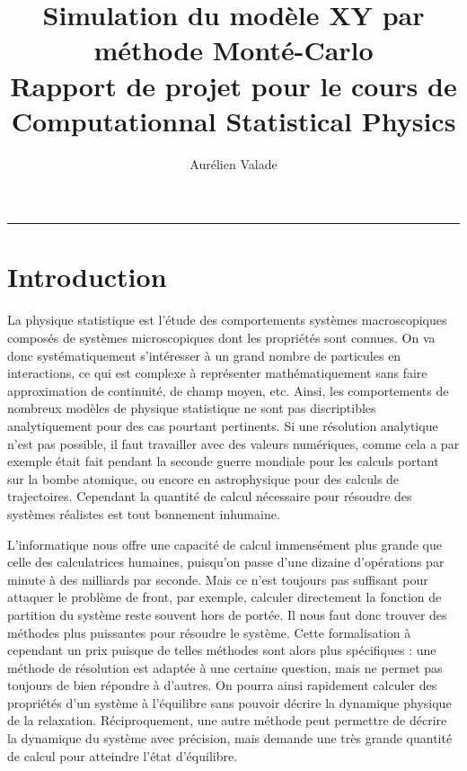 \documentclass[a4paper, openany, 11pt]{article}
\title{Simulation du modèle XY par méthode Monté-Carlo \medskip \\ 
       \Large Rapport de projet pour le cours de Computationnal Statistical Physics }
\author{Aurélien Valade}
\date{}
\begin{document}
\maketitle

{\centering \rule{\textwidth}{.5pt} }

\section*{Introduction}

La physique statistique est l'étude des comportements systèmes macroscopiques composés de systèmes
microscopiques dont les propriétés sont connues. On va donc systématiquement s'intéresser à un grand
nombre de particules en interactions, ce qui est complexe à représenter mathématiquement sans faire
approximation de continuité, de champ moyen, etc. Ainsi, les comportements de nombreux modèles de
physique statistique ne sont pas discriptibles analytiquement pour des cas pourtant pertinents.  Si
une résolution analytique n'est pas possible, il faut travailler avec des valeurs numériques, comme
cela a par exemple était fait pendant la seconde guerre mondiale pour les calculs portant sur la
bombe atomique, ou encore en astrophysique pour des calculs de trajectoires.  Cependant la quantité
de calcul nécessaire pour résoudre des systèmes réalistes est tout bonnement inhumaine.

L'informatique nous offre une capacité de calcul immensément plus grande que celle des calculatrices
humaines, puisqu'on passe d'une dizaine d'opérations par minute à des milliards par seconde. Mais ce
n'est toujours pas suffisant pour attaquer le problème de front, par exemple, calculer directement
la fonction de partition du système reste souvent hors de portée. Il nous faut donc trouver des
méthodes plus puissantes pour résoudre le système. Cette formalisation à cependant un prix puisque
de telles méthodes sont alors plus spécifiques : une méthode de résolution est adaptée à une
certaine question, mais ne permet pas toujours de bien répondre à d'autres. On pourra ainsi
rapidement calculer des propriétés d'un système à l'équilibre sans pouvoir décrire la dynamique
physique de la relaxation. Réciproquement, une autre méthode peut permettre de décrire la dynamique
du système avec précision, mais demande une très grande quantité de calcul pour atteindre l'état
d'équilibre. 
\end{document}
